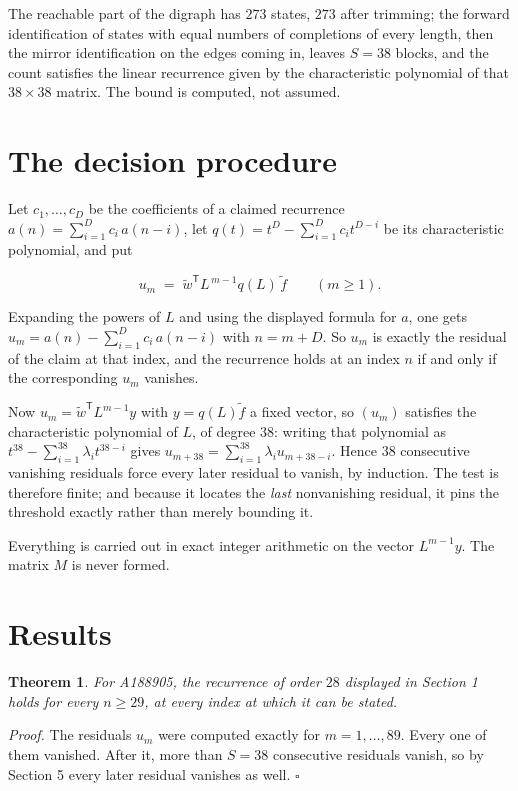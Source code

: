 \documentclass[11pt]{article}
\newtheorem{theorem}{Theorem}
\theoremstyle{definition}
\begin{document}
The reachable part of the digraph has $273$ states, $273$ after trimming; the forward identification of states with equal numbers of completions of every length, then the mirror identification on the edges coming in, leaves $S = 38$ blocks, and the count satisfies the linear recurrence given by the characteristic polynomial of that $38\times38$ matrix. The bound is computed, not assumed.

\section{The decision procedure}

Let $c_1,\dots,c_D$ be the coefficients of a claimed recurrence $a(n) = \sum_{i=1}^{D} c_i\,a(n-i)$, let $q(t) = t^{D} - \sum_{i=1}^{D} c_i t^{D-i}$ be its characteristic polynomial, and put

\[u_m \;=\; \tilde w^{\mathsf T} L^{\,m-1} q(L)\,\tilde f \qquad (m \ge 1).\]

Expanding the powers of $L$ and using the displayed formula for $a$, one gets $u_m = a(n) - \sum_{i=1}^{D} c_i\,a(n-i)$ with $n = m + D$. So $u_m$ is exactly the residual of the claim at that index, and the recurrence holds at an index $n$ if and only if the corresponding $u_m$ vanishes.

Now $u_m = \tilde w^{\mathsf T} L^{m-1} y$ with $y = q(L)\tilde f$ a fixed vector, so $(u_m)$ satisfies the characteristic polynomial of $L$, of degree $38$: writing that polynomial as $t^{38} - \sum_{i=1}^{38} \lambda_i t^{38-i}$ gives $u_{m+38} = \sum_{i=1}^{38} \lambda_i u_{m+38-i}$. Hence $38$ consecutive vanishing residuals force every later residual to vanish, by induction. The test is therefore finite; and because it locates the {\itshape last} nonvanishing residual, it pins the threshold exactly rather than merely bounding it.

Everything is carried out in exact integer arithmetic on the vector $L^{m-1}y$. The matrix $M$ is never formed.

\section{Results}

\begin{theorem} For A188905, the recurrence of order $28$ displayed in Section 1 holds for every $n \ge 29$, at every index at which it can be stated.\end{theorem}

{\itshape Proof.} The residuals $u_m$ were computed exactly for $m = 1,\dots,89$. Every one of them vanished. After it, more than $S = 38$ consecutive residuals vanish, so by Section 5 every later residual vanishes as well. $\square$
\end{document}

